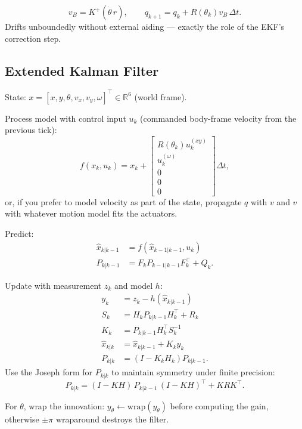 \documentclass[11pt,a4paper]{article}
\newcommand{\R}{\mathbb{R}}
\begin{document}
\begin{equation}
    v_B = K^+ (\dot\theta\, r), \qquad
    q_{k+1} = q_k + R(\theta_k) v_B\, \Delta t.
\end{equation}
Drifts unboundedly without external aiding --- exactly the role of the
EKF's correction step.

\subsection*{Extended Kalman Filter}

State: $x = [x, y, \theta, v_x, v_y, \omega]^\top \in \R^6$ (world frame).

Process model with control input $u_k$ (commanded body-frame velocity from
the previous tick):
\begin{equation}
    f(x_k, u_k) = x_k +
    \begin{bmatrix} R(\theta_k) u_k^{(xy)} \\ u_k^{(\omega)} \\ 0 \\ 0 \\ 0 \end{bmatrix} \Delta t,
\end{equation}
or, if you prefer to model velocity as part of the state, propagate $q$
with $v$ and $v$ with whatever motion model fits the actuators.

Predict:
\begin{align}
    \hat{x}_{k|k-1} &= f(\hat{x}_{k-1|k-1}, u_k) \\
    P_{k|k-1}       &= F_k P_{k-1|k-1} F_k^\top + Q_k.
\end{align}

Update with measurement $z_k$ and model $h$:
\begin{align}
    y_k       &= z_k - h(\hat{x}_{k|k-1}) \\
    S_k       &= H_k P_{k|k-1} H_k^\top + R_k \\
    K_k       &= P_{k|k-1} H_k^\top S_k^{-1} \\
    \hat{x}_{k|k} &= \hat{x}_{k|k-1} + K_k y_k \\
    P_{k|k}   &= (I - K_k H_k) P_{k|k-1}.
\end{align}
Use the Joseph form for $P_{k|k}$ to maintain symmetry under finite
precision:
\begin{equation}
    P_{k|k} = (I - K H)\, P_{k|k-1}\, (I - K H)^\top + K R K^\top.
\end{equation}

For $\theta$, wrap the innovation: $y_\theta \leftarrow \mathrm{wrap}(y_\theta)$
before computing the gain, otherwise $\pm \pi$ wraparound destroys the
filter.
\end{document}
